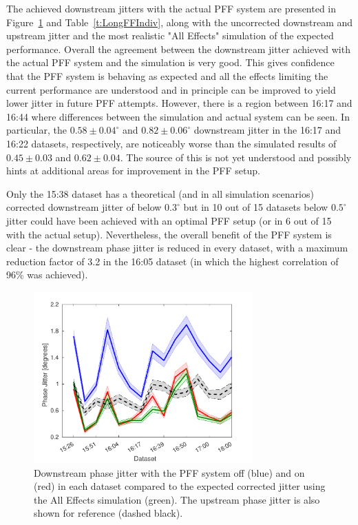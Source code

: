 The achieved downstream jitters with the actual PFF system are presented in Figure~\ref{f:longFF_jitDatSet} and Table~\ref{t:LongFFIndiv}, along with the uncorrected downstream and upstream jitter and the most realistic "All Effects" simulation of the expected performance. Overall the agreement between the downstream jitter achieved with the actual PFF system and the simulation is very good. This gives confidence that the PFF system is behaving as expected and all the effects limiting the current performance are understood and in principle can be improved to yield lower jitter in future PFF attempts. However, there is a region between 16:17 and 16:44 where differences between the simulation and actual system can be seen. In particular, the \(0.58\pm0.04^\circ\) and \(0.82\pm0.06^\circ\) downstream jitter in the 16:17 and 16:22 datasets, respectively, are noticeably worse than the simulated results of \(0.45\pm0.03\) and \(0.62\pm0.04\). The source of this is not yet understood and possibly hints at additional areas for improvement in the PFF setup.

Only the 15:38 dataset has a theoretical (and in all simulation scenarios) corrected downstream jitter of below \(0.3^\circ\) but in 10 out of 15 datasets below \(0.5^\circ\) jitter could have been achieved with an optimal PFF setup (or in 6 out of 15 with the actual setup). Nevertheless, 
the overall benefit of the PFF system is clear - the downstream phase jitter is reduced in every dataset, with a maximum reduction factor of 3.2 in the 16:05 dataset (in which the highest correlation of 96\% was achieved).


\begin{figure}
  \centering
  \includegraphics[width=0.75\textwidth]{Figures/feedforward/longFF_jitDatSet}
  \caption{Downstream phase jitter with the PFF system off (blue) and on (red) in each dataset compared to the expected corrected jitter using the All Effects simulation (green). The upstream phase jitter is also shown for reference (dashed black).}
  \label{f:longFF_jitDatSet}
\end{figure}

